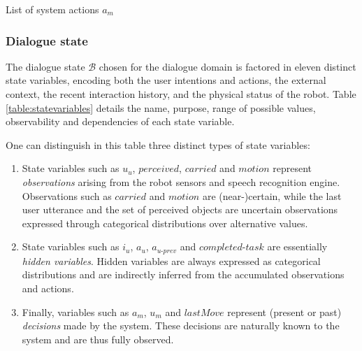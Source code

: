 \begin{table}[p!]
\begin{footnotesize}
\end{footnotesize}
 \caption{List of system actions $a_m$} 
\label{table:systemdas_exp3}
\end{table}

\subsubsection*{Dialogue state}

The dialogue state $\mathcal{B}$ chosen for the dialogue domain is factored in eleven distinct state variables, encoding both the user intentions and actions, the external context, the recent interaction history, and the physical status of the robot. Table \ref{table:statevariables} details the name, purpose, range of possible values, observability and dependencies of each state variable. 

One can distinguish in this table three distinct types of state variables:
\begin{enumerate}
\item State variables such as $u_u$, $\mathit{perceived}$, $\mathit{carried}$ and $\mathit{motion}$ represent \textit{observations} arising from the robot sensors and speech recognition engine. Observations such as $\mathit{carried}$ and $\mathit{motion}$ are (near-)certain, while the last user utterance and the set of perceived objects are uncertain observations expressed through categorical distributions over alternative values. 
\item State variables such as $i_u$, $a_u$, $a_{u\mbox{-}prev}$ and $\mathit{completed\mbox{-}task}$ are essentially \textit{hidden variables}. Hidden variables are always expressed as categorical distributions and are indirectly inferred from the accumulated observations and actions.
\item Finally, variables such as $a_m$, $u_m$ and $\mathit{lastMove}$ represent (present or past) \textit{decisions} made by the system. These decisions are naturally known to the system and are thus fully observed. 
\end{enumerate}

